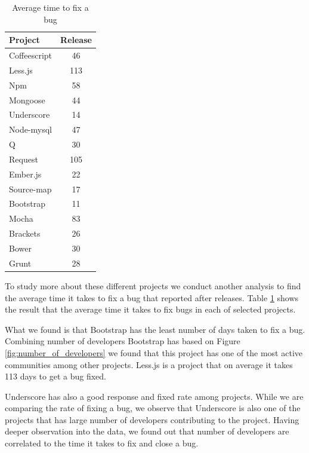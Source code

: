 \begin{table}[!hbt]
	\begin{center}
		\caption{Average time to fix a bug}
		\label{tab:average_time_bugfix}
		\begin{tabular}{l| c }
			\toprule
			\textbf{Project}  & \textbf{Release} \\ \midrule              
			Coffeescript    & 46  \\
			Less.js         & 113 \\
			Npm             & 58  \\
			Mongoose        & 44  \\
			Underscore      & 14  \\
			Node-mysql      & 47  \\
			Q               & 30  \\
			Request         & 105 \\
			Ember.js        & 22  \\
			Source-map      & 17  \\
			Bootstrap       & 11  \\
			Mocha           & 83  \\
			Brackets        & 26  \\
			Bower           & 30  \\
			Grunt           & 28  \\  \bottomrule
		\end{tabular}
	\end{center}
\end{table}

To study more about these different projects we conduct another analysis to find the average time it takes to fix a bug that reported after releases. Table \ref{tab:average_time_bugfix} shows the result that the average time it takes to fix bugs in each of selected projects. 
\par 
What we found is that Bootstrap has the least number of days taken to fix a bug. Combining number of developers Bootstrap has based on Figure \ref{fig:number_of_developers} we found that this project has one of the most active communities among other projects. Less.js is a project that on average it takes 113 days to get a bug fixed. 
\par
Underscore has also a good response and fixed rate among projects. While we are comparing the rate of fixing a bug, we observe that Underscore is also one of the projects that has large number of developers contributing to the project. Having deeper observation into the data, we found out that number of developers are correlated to the time it takes to fix and close a bug.

